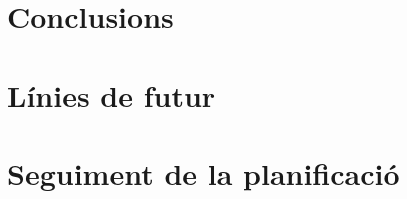 \documentclass[CAT,BIB]{TFUOC}%
\begin{document}
    \section{Conclusions}


    \section{Línies de futur}

    \section{Seguiment de la planificació}
\end{document}
